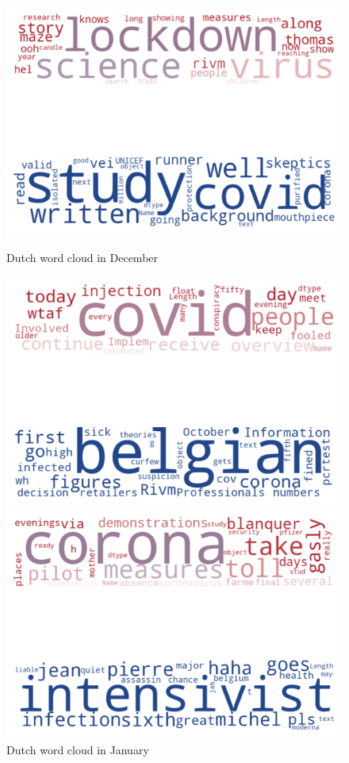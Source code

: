 \begin{landscape}
\newpage

\begin{figure}[!htb]
  \includegraphics[width=\linewidth]{December nl word cloud.png}
  \caption{Dutch word cloud in December}\label{fig:decembernl}
\endminipage\hfill
{}
  \includegraphics[width=\linewidth]{January nl word cloud.png}
  \caption{Dutch word cloud in January}\label{fig:januarynl}
\endminipage\hfill
{}
  \includegraphics[width=\linewidth]{February nl word cloud.png}

\end{figure}
\end{landscape}
